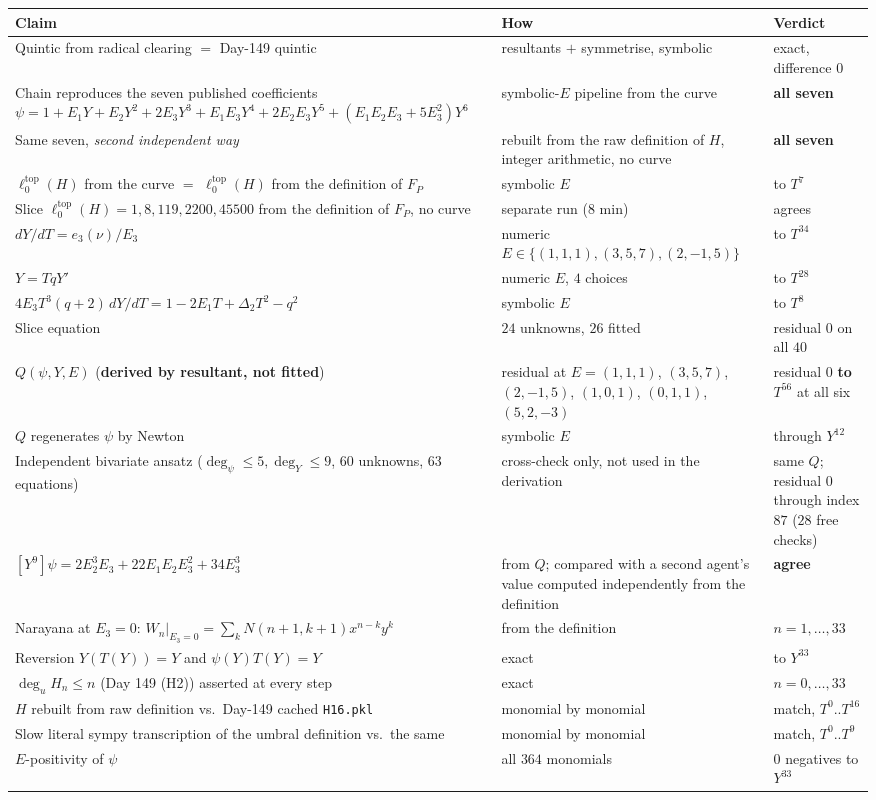 \documentclass[11pt,a4paper]{article}
\newcommand{\ltop}{\ell^{\mathrm{top}}}
\theoremstyle{plain}
\theoremstyle{definition}
\begin{document}
\begin{center}
\small
\sloppy\begin{longtable}{@{}p{}|p{}|p{}@{}}
\toprule
\textbf{Claim} & \textbf{How} & \textbf{Verdict}\\
\midrule
\endhead
Quintic from radical clearing $=$ Day-149 quintic & resultants $+$ symmetrise, symbolic & exact, difference $0$\\
Chain reproduces the seven published coefficients $\psi=1+E_1Y+E_2Y^2+2E_3Y^3+E_1E_3Y^4+2E_2E_3Y^5+(E_1E_2E_3+5E_3^2)Y^6$ & symbolic-$E$ pipeline from the curve & \textbf{all seven}\\
Same seven, \emph{second independent way} & rebuilt from the raw definition of $H$, integer arithmetic, no curve & \textbf{all seven}\\
$\ltop_0(H)$ from the curve $=$ $\ltop_0(H)$ from the definition of $F_P$ & symbolic $E$ & to $T^7$\\
Slice $\ltop_0(H)=1,8,119,2200,45500$ from the definition of $F_P$, no curve & separate run ($8$ min) & agrees\\
$dY/dT=e_3(\nu)/E_3$ & numeric $E\in\{(1,1,1),(3,5,7),(2,-1,5)\}$ & to $T^{34}$\\
$Y=TqY'$ & numeric $E$, $4$ choices & to $T^{28}$\\
$4E_3T^3(q+2)\,dY/dT=1-2E_1T+\Delta_2T^2-q^2$ & symbolic $E$ & to $T^{8}$\\
Slice equation & $24$ unknowns, $26$ fitted & residual $0$ on all $40$\\
$Q(\psi,Y,E)$ (\textbf{derived by resultant, not fitted}) & residual at $E=(1,1,1)$, $(3,5,7)$, $(2,-1,5)$, $(1,0,1)$, $(0,1,1)$, $(5,2,-3)$ & residual $0$ \textbf{to $T^{56}$} at all six\\
$Q$ regenerates $\psi$ by Newton & symbolic $E$ & through $Y^{12}$\\
Independent bivariate ansatz ($\deg_\psi\le5,\deg_Y\le9$, $60$ unknowns, $63$ equations) & cross-check only, not used in the derivation & same $Q$; residual $0$ through index $87$ ($28$ free checks)\\
$[Y^9]\psi=2E_2^3E_3+22E_1E_2E_3^2+34E_3^3$ & from $Q$; compared with a second agent's value computed independently from the definition & \textbf{agree}\\
Narayana at $E_3=0$: $W_n|_{E_3=0}=\sum_kN(n{+}1,k{+}1)x^{n-k}y^k$ & from the definition & $n=1,\dots,33$\\
Reversion $Y(T(Y))=Y$ and $\psi(Y)T(Y)=Y$ & exact & to $Y^{33}$\\
$\deg_u H_n\le n$ (Day 149 (H2)) asserted at every step & exact & $n=0,\dots,33$\\
$H$ rebuilt from raw definition vs.\ Day-149 cached \texttt{H16.pkl} & monomial by monomial & match, $T^0..T^{16}$\\
Slow literal sympy transcription of the umbral definition vs.\ the same & monomial by monomial & match, $T^0..T^{9}$\\
$E$-positivity of $\psi$ & all $364$ monomials & $0$ negatives to $Y^{33}$\\
\bottomrule
\end{longtable}
\end{center}
\end{document}
